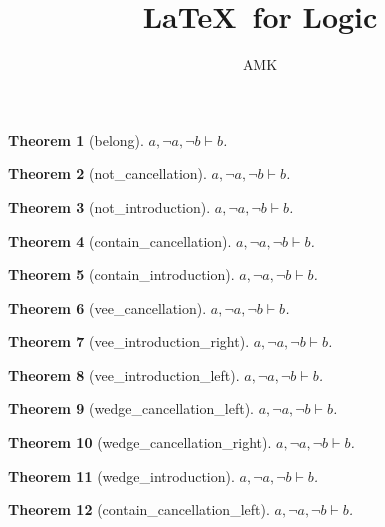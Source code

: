 \documentclass[11pt]{article}
\title{\textbf{\LaTeX\ for Logic}}
\author{AMK}
\newtheorem{theorem}{Theorem}
\def\turn{\vdash}
\begin{document}
\maketitle
\begin{theorem}[belong] $ a, \neg a, \neg b \turn b $.\\
\end{theorem}
\begin{theorem}[not_cancellation] $ a, \neg a, \neg b \turn b $.\\
\end{theorem}
\begin{theorem}[not_introduction] $ a, \neg a, \neg b \turn b $.\\
\end{theorem}
\begin{theorem}[contain_cancellation] $ a, \neg a, \neg b \turn b $.\\
\end{theorem}
\begin{theorem}[contain_introduction] $ a, \neg a, \neg b \turn b $.\\
\end{theorem}
\begin{theorem}[vee_cancellation] $ a, \neg a, \neg b \turn b $.\\
\end{theorem}
\begin{theorem}[vee_introduction_right] $ a, \neg a, \neg b \turn b $.\\
\end{theorem}
\begin{theorem}[vee_introduction_left] $ a, \neg a, \neg b \turn b $.\\
\end{theorem}
\begin{theorem}[wedge_cancellation_left] $ a, \neg a, \neg b \turn b $.\\
\end{theorem}
\begin{theorem}[wedge_cancellation_right] $ a, \neg a, \neg b \turn b $.\\
\end{theorem}
\begin{theorem}[wedge_introduction] $ a, \neg a, \neg b \turn b $.\\
\end{theorem}
\begin{theorem}[contain_cancellation_left] $ a, \neg a, \neg b \turn b $.\\
\end{theorem}
\end{document}
